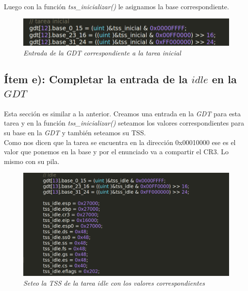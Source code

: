 Luego con la función \textit{tss\_inicializar()} le asignamos la base correspondiente.

\begin{figure}[H]
\begin{center}
\includegraphics[width=\linewidth]{ejercicio6/tss_inicializar_base_inicial.png}
\caption{{\small \textit{Entrada de la \textit{GDT} correspondiente a la tarea inicial }}}
\endminipage
\end{center}
\end{figure}

\subsection{Ítem e): Completar la entrada de la $idle$ en la $GDT$}
Esta sección es similar a la anterior. Creamos una entrada en la \textit{GDT} para esta tarea y en la función \textit{tss\_inicializar()} seteamos los valores correspondientes para su base en la \textit{GDT} y también seteamos su TSS.\\
Como nos dicen que la tarea se encuentra en la dirección 0x00010000 ese es el valor que ponemos en la base y por el enunciado va a compartir el CR3. Lo mismo con su pila.\\

\begin{figure}[H]
\begin{center}
\includegraphics[width=\linewidth]{ejercicio6/tss_idle.png}
\caption{{\small \textit{Seteo la TSS de la tarea idle con los valores correspondientes}}}
\endminipage
\end{center}
\end{figure}

